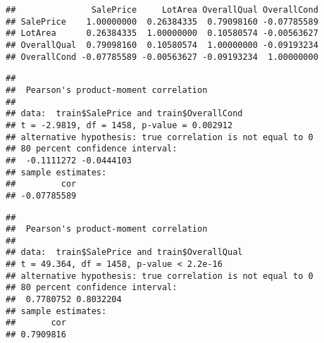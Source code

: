 \documentclass[
]{article}
\newenvironment{Shaded}{\begin{snugshade}}{\end{snugshade}}
\newcommand{\DataTypeTok}[1]{\textcolor[rgb]{0.13,0.29,0.53}{#1}}
\newcommand{\FloatTok}[1]{\textcolor[rgb]{0.00,0.00,0.81}{#1}}
\newcommand{\KeywordTok}[1]{\textcolor[rgb]{0.13,0.29,0.53}{\textbf{#1}}}
\newcommand{\NormalTok}[1]{#1}
\newcommand{\OperatorTok}[1]{\textcolor[rgb]{0.81,0.36,0.00}{\textbf{#1}}}
\begin{document}
\begin{verbatim}
##               SalePrice     LotArea OverallQual OverallCond
## SalePrice    1.00000000  0.26384335  0.79098160 -0.07785589
## LotArea      0.26384335  1.00000000  0.10580574 -0.00563627
## OverallQual  0.79098160  0.10580574  1.00000000 -0.09193234
## OverallCond -0.07785589 -0.00563627 -0.09193234  1.00000000
\end{verbatim}

\begin{Shaded}
\end{Shaded}

\begin{verbatim}
## 
##  Pearson's product-moment correlation
## 
## data:  train$SalePrice and train$OverallCond
## t = -2.9819, df = 1458, p-value = 0.002912
## alternative hypothesis: true correlation is not equal to 0
## 80 percent confidence interval:
##  -0.1111272 -0.0444103
## sample estimates:
##         cor 
## -0.07785589
\end{verbatim}

\begin{Shaded}
\end{Shaded}

\begin{verbatim}
## 
##  Pearson's product-moment correlation
## 
## data:  train$SalePrice and train$OverallQual
## t = 49.364, df = 1458, p-value < 2.2e-16
## alternative hypothesis: true correlation is not equal to 0
## 80 percent confidence interval:
##  0.7780752 0.8032204
## sample estimates:
##       cor 
## 0.7909816
\end{verbatim}

\begin{Shaded}
\end{Shaded}
\end{document}
